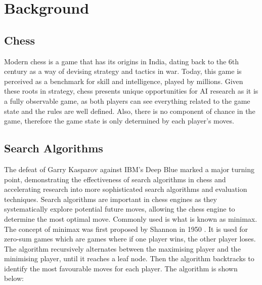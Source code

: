 \chapter{Background}
\section{Chess}
Modern chess is a game that has its origins in India, dating back to the 6th century \cite{averbakhHistoryChessChaturanga2012} as a way of devising strategy and tactics in war. Today, this game is perceived as a benchmark for skill and intelligence, played by millions. Given these roots in strategy, chess presents unique opportunities for AI research as it is a fully observable game, as both players can see everything related to the game state and the rules are well defined. Also, there is no component of chance in the game, therefore the game state is only determined by each player's moves.


\section{Search Algorithms}

The defeat of Garry Kasparov against IBM's Deep Blue marked a major turning point, demonstrating the effectiveness of search algorithms in chess and accelerating research into more sophisticated search algorithms and evaluation techniques. Search algorithms are important in chess engines as they systematically explore potential future moves, allowing the chess engine to determine the most optimal move. Commonly used is what is known as minimax. The concept of minimax was first proposed by Shannon in 1950 \cite{shannonXXIIProgrammingComputer1950}.
It is used for zero-sum games which are games where if one player wins, the other player loses. The algorithm recursively alternates between the maximising player and the minimising player, until it reaches a leaf node. Then the algorithm backtracks to identify the most favourable moves for each player. The algorithm is shown below:



